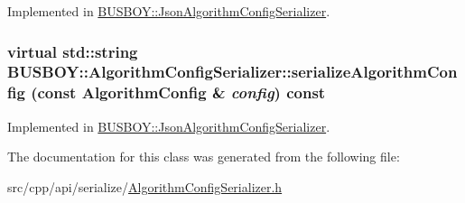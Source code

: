 Implemented in \hyperlink{classBUSBOY_1_1JsonAlgorithmConfigSerializer_ad644fb4019e1d0596e8e91b9fa6ede54}{BUSBOY::JsonAlgorithmConfigSerializer}.\hypertarget{classBUSBOY_1_1AlgorithmConfigSerializer_aab7e9c8da6db22fd09cc1faf8758e58f}{
\subsubsection[{serializeAlgorithmConfig}]{\setlength{\rightskip}{0pt plus 5cm}virtual std::string BUSBOY::AlgorithmConfigSerializer::serializeAlgorithmConfig (const {\bf AlgorithmConfig} \& {\em config}) const}}
\label{classBUSBOY_1_1AlgorithmConfigSerializer_aab7e9c8da6db22fd09cc1faf8758e58f}


Implemented in \hyperlink{classBUSBOY_1_1JsonAlgorithmConfigSerializer_af364fc4f8156013bdc1957c9a10d4eed}{BUSBOY::JsonAlgorithmConfigSerializer}.

The documentation for this class was generated from the following file:\begin{DoxyCompactItemize}
\item 
src/cpp/api/serialize/\hyperlink{AlgorithmConfigSerializer_8h}{AlgorithmConfigSerializer.h}\end{DoxyCompactItemize}
